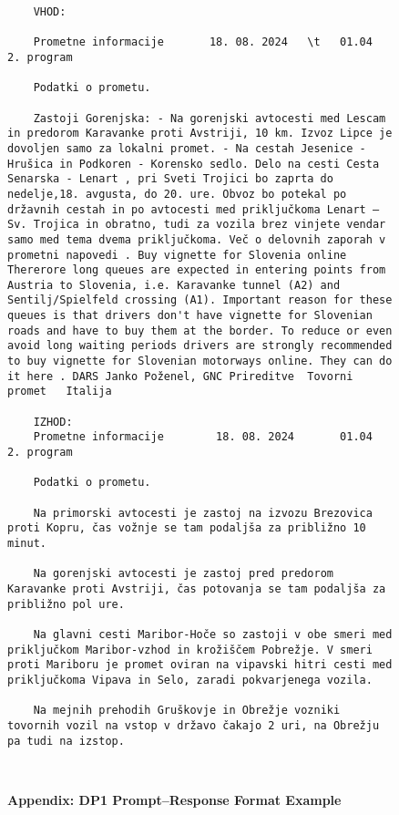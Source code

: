 \begin{figure*}[t]
    \centering
    \caption*{\textbf{Appendix: DP1 Prompt–Response Format Example}}

    \begin{verbatim}
    VHOD:

    Prometne informacije       18. 08. 2024   \t   01.04           2. program
    
    Podatki o prometu.
    
    Zastoji Gorenjska: - Na gorenjski avtocesti med Lescam in predorom Karavanke proti Avstriji, 10 km. Izvoz Lipce je dovoljen samo za lokalni promet. - Na cestah Jesenice - Hrušica in Podkoren - Korensko sedlo. Delo na cesti Cesta Senarska - Lenart , pri Sveti Trojici bo zaprta do nedelje,18. avgusta, do 20. ure. Obvoz bo potekal po državnih cestah in po avtocesti med priključkoma Lenart – Sv. Trojica in obratno, tudi za vozila brez vinjete vendar samo med tema dvema priključkoma. Več o delovnih zaporah v prometni napovedi . Buy vignette for Slovenia online Thererore long queues are expected in entering points from Austria to Slovenia, i.e. Karavanke tunnel (A2) and Sentilj/Spielfeld crossing (A1). Important reason for these queues is that drivers don't have vignette for Slovenian roads and have to buy them at the border. To reduce or even avoid long waiting periods drivers are strongly recommended to buy vignette for Slovenian motorways online. They can do it here . DARS Janko Poženel, GNC Prireditve  Tovorni promet   Italija
    
    IZHOD:
    Prometne informacije        18. 08. 2024       01.04           2. program
    
    Podatki o prometu.
    
    Na primorski avtocesti je zastoj na izvozu Brezovica proti Kopru, čas vožnje se tam podaljša za približno 10 minut.
    
    Na gorenjski avtocesti je zastoj pred predorom Karavanke proti Avstriji, čas potovanja se tam podaljša za približno pol ure.
    
    Na glavni cesti Maribor-Hoče so zastoji v obe smeri med priključkom Maribor-vzhod in krožiščem Pobrežje. V smeri proti Mariboru je promet oviran na vipavski hitri cesti med priključkoma Vipava in Selo, zaradi pokvarjenega vozila.
    
    Na mejnih prehodih Gruškovje in Obrežje vozniki tovornih vozil na vstop v državo čakajo 2 uri, na Obrežju pa tudi na izstop.



\end{verbatim}
\end{figure*}
